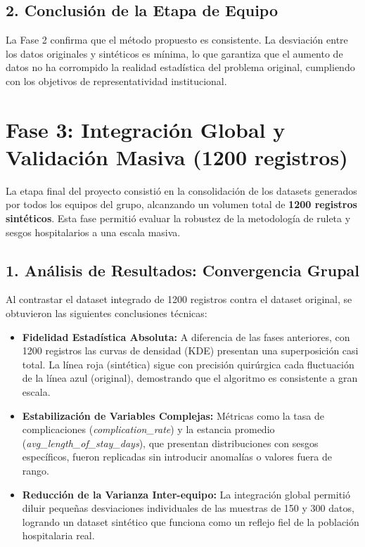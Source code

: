 \documentclass[12pt]{article}
\begin{document}
\subsection*{2. Conclusión de la Etapa de Equipo}
La Fase 2 confirma que el método propuesto es consistente. La desviación entre los datos originales y sintéticos es mínima, lo que garantiza que el aumento de datos no ha corrompido la realidad estadística del problema original, cumpliendo con los objetivos de representatividad institucional.

\section*{Fase 3: Integración Global y Validación Masiva (1200 registros)}

La etapa final del proyecto consistió en la consolidación de los datasets generados por todos los equipos del grupo, alcanzando un volumen total de \textbf{1200 registros sintéticos}. Esta fase permitió evaluar la robustez de la metodología de ruleta y sesgos hospitalarios a una escala masiva.

\subsection*{1. Análisis de Resultados: Convergencia Grupal}
Al contrastar el dataset integrado de 1200 registros contra el dataset original, se obtuvieron las siguientes conclusiones técnicas:

\begin{itemize}
    \item \textbf{Fidelidad Estadística Absoluta:} A diferencia de las fases anteriores, con 1200 registros las curvas de densidad (KDE) presentan una superposición casi total. La línea roja (sintética) sigue con precisión quirúrgica cada fluctuación de la línea azul (original), demostrando que el algoritmo es consistente a gran escala.
    \item \textbf{Estabilización de Variables Complejas:} Métricas como la tasa de complicaciones (\textit{complication\_rate}) y la estancia promedio (\textit{avg\_length\_of\_stay\_days}), que presentan distribuciones con sesgos específicos, fueron replicadas sin introducir anomalías o valores fuera de rango.
    \item \textbf{Reducción de la Varianza Inter-equipo:} La integración global permitió diluir pequeñas desviaciones individuales de las muestras de 150 y 300 datos, logrando un dataset sintético que funciona como un reflejo fiel de la población hospitalaria real.
\end{itemize}
\end{document}
